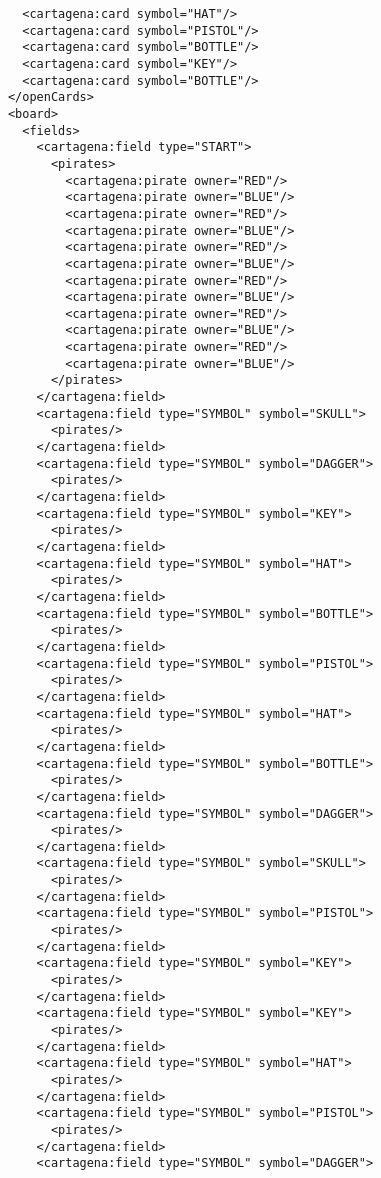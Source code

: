 \documentclass[12pt,a4paper, ngerman, oneside]{scrartcl}
\begin{document}
\begin{enumerate}
\begin{verbatim}
        <cartagena:card symbol="HAT"/>
        <cartagena:card symbol="PISTOL"/>
        <cartagena:card symbol="BOTTLE"/>
        <cartagena:card symbol="KEY"/>
        <cartagena:card symbol="BOTTLE"/>
      </openCards>
      <board>
        <fields>
          <cartagena:field type="START">
            <pirates>
              <cartagena:pirate owner="RED"/>
              <cartagena:pirate owner="BLUE"/>
              <cartagena:pirate owner="RED"/>
              <cartagena:pirate owner="BLUE"/>
              <cartagena:pirate owner="RED"/>
              <cartagena:pirate owner="BLUE"/>
              <cartagena:pirate owner="RED"/>
              <cartagena:pirate owner="BLUE"/>
              <cartagena:pirate owner="RED"/>
              <cartagena:pirate owner="BLUE"/>
              <cartagena:pirate owner="RED"/>
              <cartagena:pirate owner="BLUE"/>
            </pirates>
          </cartagena:field>
          <cartagena:field type="SYMBOL" symbol="SKULL">
            <pirates/>
          </cartagena:field>
          <cartagena:field type="SYMBOL" symbol="DAGGER">
            <pirates/>
          </cartagena:field>
          <cartagena:field type="SYMBOL" symbol="KEY">
            <pirates/>
          </cartagena:field>
          <cartagena:field type="SYMBOL" symbol="HAT">
            <pirates/>
          </cartagena:field>
          <cartagena:field type="SYMBOL" symbol="BOTTLE">
            <pirates/>
          </cartagena:field>
          <cartagena:field type="SYMBOL" symbol="PISTOL">
            <pirates/>
          </cartagena:field>
          <cartagena:field type="SYMBOL" symbol="HAT">
            <pirates/>
          </cartagena:field>
          <cartagena:field type="SYMBOL" symbol="BOTTLE">
            <pirates/>
          </cartagena:field>
          <cartagena:field type="SYMBOL" symbol="DAGGER">
            <pirates/>
          </cartagena:field>
          <cartagena:field type="SYMBOL" symbol="SKULL">
            <pirates/>
          </cartagena:field>
          <cartagena:field type="SYMBOL" symbol="PISTOL">
            <pirates/>
          </cartagena:field>
          <cartagena:field type="SYMBOL" symbol="KEY">
            <pirates/>
          </cartagena:field>
          <cartagena:field type="SYMBOL" symbol="KEY">
            <pirates/>
          </cartagena:field>
          <cartagena:field type="SYMBOL" symbol="HAT">
            <pirates/>
          </cartagena:field>
          <cartagena:field type="SYMBOL" symbol="PISTOL">
            <pirates/>
          </cartagena:field>
          <cartagena:field type="SYMBOL" symbol="DAGGER">

\end{verbatim}
\end{enumerate}
\end{document}
